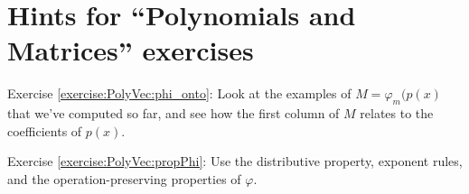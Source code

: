 \section{Hints for ``Polynomials and Matrices'' exercises}\label{sec:PolyVec:hints} 


\noindent Exercise \ref{exercise:PolyVec:phi_onto}: Look at the examples of $M=\varphi_m(p(x)$ that we've computed so far, and see how the first column of $M$ relates to the coefficients of $p(x)$.

\noindent Exercise \ref{exercise:PolyVec:propPhi}:  Use the distributive property, exponent rules, and the operation-preserving properties of $\varphi$.


